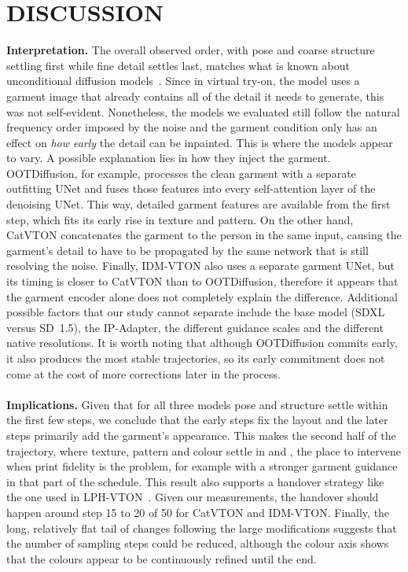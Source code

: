 \section{\uppercase{Discussion}}
\label{sec:discussion}

\textbf{Interpretation.} The overall observed order, with pose and coarse structure settling first while fine detail settles last, matches what is known about unconditional diffusion models~\cite{choi2022p2,rissanen2023ihdm}. Since in virtual try-on, the model uses a garment image that already contains all of the detail it needs to generate, this was not self-evident. Nonetheless, the models we evaluated still follow the natural frequency order imposed by the noise and the garment condition only has an effect on \emph{how early} the detail can be inpainted. This is where the models appear to vary. A possible explanation lies in how they inject the garment. OOTDiffusion, for example, processes the clean garment with a separate outfitting UNet and fuses those features into every self-attention layer of the denoising UNet. This way, detailed garment features are available from the first step, which fits its early rise in texture and pattern. On the other hand, CatVTON concatenates the garment to the person in the same input, causing the garment's detail to have to be propagated by the same network that is still resolving the noise. Finally, IDM-VTON also uses a separate garment UNet, but its timing is closer to CatVTON than to OOTDiffusion, therefore it appears that the garment encoder alone does not completely explain the difference. Additional possible factors that our study cannot separate include the base model (SDXL versus SD~1.5), the IP-Adapter, the different guidance scales and the different native resolutions. It is worth noting that although OOTDiffusion commits early, it also produces the most stable trajectories, so its early commitment does not come at the cost of more corrections later in the process.
\\ \\
\textbf{Implications.} Given that for all three models pose and structure settle within the first few steps, we conclude that the early steps fix the layout and the later steps primarily add the garment's appearance. This makes the second half of the trajectory, where texture, pattern and colour settle in \catvton and \idm, the place to intervene when print fidelity is the problem, for example with a stronger garment guidance in that part of the schedule. This result also supports a handover strategy like the one used in LPH-VTON~\cite{liu2026lphvton}. Given our measurements, the handover should happen around step 15 to 20 of 50 for CatVTON and IDM-VTON. Finally, the long, relatively flat tail of changes following the large modifications suggests that the number of sampling steps could be reduced, although the colour axis shows that the colours appear to be continuously refined until the end.
